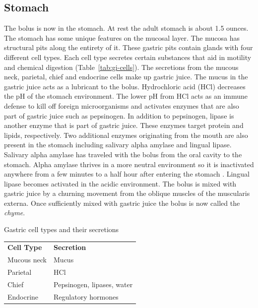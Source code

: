 \documentclass{tufte-handout}
\begin{document}
\subsection{Stomach}
The bolus is now in the stomach. At rest the adult stomach is about 1.5 ounces. The stomach has some unique features on the mucosal layer. The mucosa has structural pits along the entirety of it. These gastric pits contain glands with four different cell types. Each cell type secretes certain substances that aid in motility and chemical digestion (Table~\ref{tab:gi-cells}). The secretions from the mucous neck, parietal, chief and endocrine cells make up gastric juice. The mucus in the gastric juice acts as a lubricant to the bolus. Hydrochloric acid (HCl) decreases the pH of the stomach environment. The lower pH from HCl acts as an immune defense to kill off foreign microorganisms and activates enzymes that are also part of gastric juice such as pepsinogen. In addition to pepsinogen, lipase is another enzyme that is part of gastric juice. These enzymes target protein and lipids, respectively. Two additional enzymes originating from the mouth are also present in the stomach including salivary alpha amylase and lingual lipase. Salivary alpha amylase has traveled with the bolus from the oral cavity to the stomach. Alpha amylase thrives in a more neutral environment so it is inactivated anywhere from a few minutes to a half hour after entering the stomach \citep{Rohleder2009}. Lingual lipase becomes activated in the acidic environment. The bolus is mixed with gastric juice by a churning movement from the oblique muscles of the muscularis externa. Once sufficiently mixed with gastric juice the bolus is now called the \emph{chyme}. 

\begin{margintable}
\caption{Gastric cell types and their secretions}\label{tab:gi-cells}
\begin{tabular}{ll}
\textbf{Cell Type} & \textbf{Secretion} \\
Mucous neck	 & Mucus                     \\
Parietal & HCl             \\
Chief & Pepsinogen, lipases, water \\
Endocrine & Regulatory hormones                    
\end{tabular}
\end{margintable}
\end{document}
